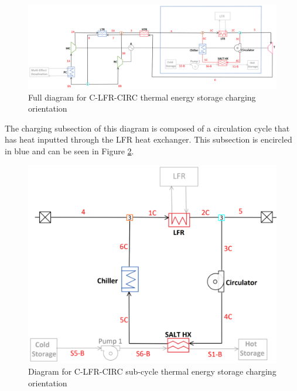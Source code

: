 \begin{figure}[H]
    \widefigure
    \includegraphics[width=\linewidth]{Definitions/c-lfr-circ.pdf}
    \caption{Full diagram for C-LFR-CIRC thermal energy storage charging orientation\label{c-lfr-circ}}
\end{figure}
\begin{paracol}{2}
\linenumbers
\switchcolumn

The charging subsection of this diagram is composed of a circulation cycle that has heat inputted through the LFR heat exchanger. This subsection is encircled in blue and can be seen in Figure \ref{c-lfr-circ-sub}.


\end{paracol}
\begin{figure}[H]
    \widefigure
    \includegraphics[width=10 cm]{Definitions/c-lfr-circ-sub.pdf}
    \caption{Diagram for C-LFR-CIRC sub-cycle thermal energy storage charging orientation\label{c-lfr-circ-sub}}
\end{figure}
